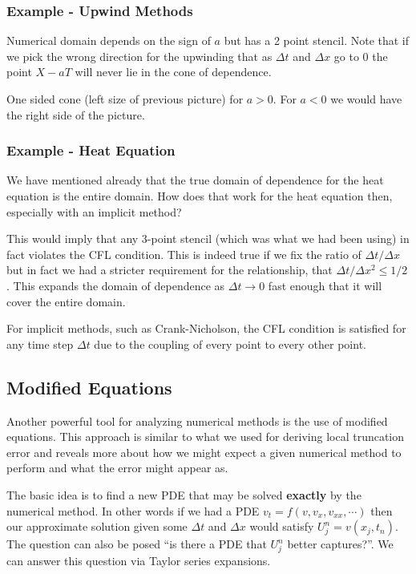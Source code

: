 \documentclass[11pt]{article}
\begin{document}
    \hypertarget{example---upwind-methods}{%
\subsubsection{Example - Upwind
Methods}\label{example---upwind-methods}}

Numerical domain depends on the sign of \(a\) but has a 2 point stencil.
Note that if we pick the wrong direction for the upwinding that as
\(\Delta t\) and \(\Delta x\) go to 0 the point \(X - a T\) will never
lie in the cone of dependence.

 One sided cone (left size of previous picture) for \(a>0\). For \(a<0\)
we would have the right side of the picture.

    \hypertarget{example---heat-equation}{%
\subsubsection{Example - Heat Equation}\label{example---heat-equation}}

We have mentioned already that the true domain of dependence for the
heat equation is the entire domain. How does that work for the heat
equation then, especially with an implicit method?

    This would imply that any 3-point stencil (which was what we had been
using) in fact violates the CFL condition. This is indeed true if we fix
the ratio of \(\Delta t / \Delta x\) but in fact we had a stricter
requirement for the relationship, that
\(\Delta t / \Delta x^2 \leq 1 / 2\). This expands the domain of
dependence as \(\Delta t \rightarrow 0\) fast enough that it will cover
the entire domain.

For implicit methods, such as Crank-Nicholson, the CFL condition is
satisfied for any time step \(\Delta t\) due to the coupling of every
point to every other point.

    \hypertarget{modified-equations}{%
\subsection{Modified Equations}\label{modified-equations}}

Another powerful tool for analyzing numerical methods is the use of
modified equations. This approach is similar to what we used for
deriving local truncation error and reveals more about how we might
expect a given numerical method to perform and what the error might
appear as.

    The basic idea is to find a new PDE that may be solved \textbf{exactly}
by the numerical method. In other words if we had a PDE
\(v_t = f(v, v_x, v_{xx}, \cdots)\) then our approximate solution given
some \(\Delta t\) and \(\Delta x\) would satisfy
\(U^n_j = v(x_j, t_n)\). The question can also be posed ``is there a PDE
that \(U^n_j\) better captures?''. We can answer this question via
Taylor series expansions.
\end{document}
